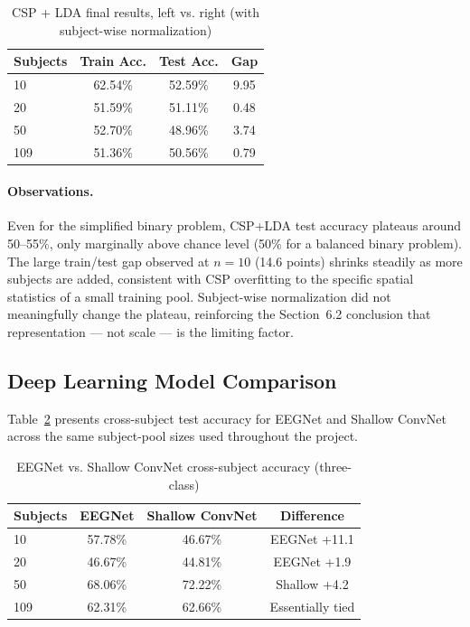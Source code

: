 \documentclass[11pt,a4paper]{article}
\begin{document}
\begin{table}[h!]
\centering
\caption{CSP + LDA final results, left vs. right (with subject-wise normalization)}
\label{tab:csp-final-2}
\begin{tabular}{lccc}
\toprule
\textbf{Subjects} & \textbf{Train Acc.} & \textbf{Test Acc.} & \textbf{Gap} \\
\midrule
10  & 62.54\% & 52.59\% & 9.95 \\
20  & 51.59\% & 51.11\% & 0.48 \\
50  & 52.70\% & 48.96\% & 3.74 \\
109 & 51.36\% & 50.56\% & 0.79 \\
\bottomrule
\end{tabular}
\end{table}

\paragraph{Observations.} Even for the simplified binary problem, CSP+LDA test accuracy plateaus around 50--55\%, only marginally above chance level (50\% for a balanced binary problem). The large train/test gap observed at $n=10$ (14.6 points) shrinks steadily as more subjects are added, consistent with CSP overfitting to the specific spatial statistics of a small training pool. Subject-wise normalization did not meaningfully change the plateau, reinforcing the Section~6.2 conclusion that representation --- not scale --- is the limiting factor.

\subsection{Deep Learning Model Comparison}
Table~\ref{tab:dl-comparison} presents cross-subject test accuracy for EEGNet and Shallow ConvNet across the same subject-pool sizes used throughout the project.

\begin{table}[h!]
\centering
\caption{EEGNet vs. Shallow ConvNet cross-subject accuracy (three-class)}
\label{tab:dl-comparison}
\begin{tabular}{lccc}
\toprule
\textbf{Subjects} & \textbf{EEGNet} & \textbf{Shallow ConvNet} & \textbf{Difference} \\
\midrule
10  & 57.78\% & 46.67\% & EEGNet +11.1 \\
20  & 46.67\% & 44.81\% & EEGNet +1.9 \\
50  & 68.06\% & 72.22\% & Shallow +4.2 \\
109 & 62.31\% & 62.66\% & Essentially tied \\
\bottomrule
\end{tabular}
\end{table}
\end{document}

